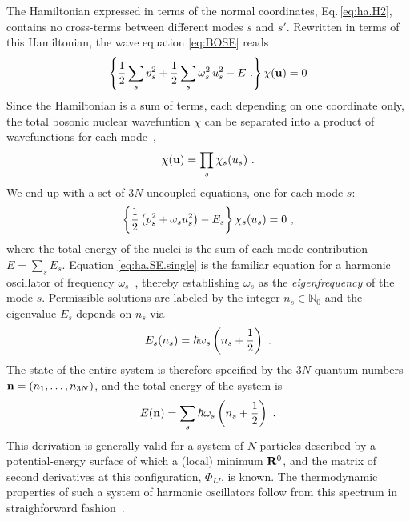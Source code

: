 The Hamiltonian expressed in terms of the normal coordinates, Eq.\,\eqref{eq:ha.H2}, contains no cross-terms between different modes $s$ and $s'$. Rewritten in terms of this Hamiltonian, the wave equation \eqref{eq:BOSE} reads
\begin{align}
	\left\{
		\halb \sum_s p_s^2 + \halb \sum_{s} \omega_s^2	\, u_s^2 - E~.
	\right\} \chi ({\bf u})
	= 0
	\label{eq:ha.SE.2}
\end{align}
Since the Hamiltonian is a sum of terms, each depending on one coordinate only, the total bosonic nuclear wavefuntion $\chi$ can be separated into a product of wavefunctions for each mode~\cite[p.\,175]{BornHuang},
\begin{align}
	\chi({\bf u}) = \prod_{s} \chi_s (u_s)~.
	\label{eq:ha.chi}
\end{align}
We end up with a set of $3N$ uncoupled equations, one for each mode $s$:
\begin{align}
	\left\{	\halb \left( p_s^2 + \omega_s u_s^2 \right)	- E_s	\right\} \chi_s (u_s)
		= 0~,
	\label{eq:ha.SE.single}
\end{align}
where the total energy of the nuclei is the sum of each mode contribution $E = \sum_s E_s$. Equation \eqref{eq:ha.SE.single} is the familiar equation for a harmonic oscillator of frequency $\omega_s$~\cite{Dirac1981}, thereby establishing $\omega_s$ as the \emph{eigenfrequency} of the mode $s$. Permissible solutions are labeled by the integer $n_s \in \mathds N_0$ and the eigenvalue $E_s$ depends on $n_s$ via
\begin{align}
	E_s(n_s) = \hbar \omega_s \left( n_s + \halb \right)~.
	\label{eq:E_s}
\end{align}
The state of the entire system is therefore specified by the $3N$ quantum numbers ${\bf n} = (n_1, \ldots, n_{3N})$, and the total energy of the system is
\begin{align}
	E ({\bf n}) = \sum_s \hbar \omega_s \left( n_s + \frac{1}{2} \right)~.
\end{align}
This derivation is generally valid for a system of $N$ particles described by a potential-energy surface of which a (local) minimum ${\bf R}^0$, and the matrix of second derivatives at this configuration, $\Phi_{IJ}$, is known. The thermodynamic properties of such a system of harmonic oscillators follow from this spectrum in straighforward fashion~\cite{BornHuang}.

\newpage

